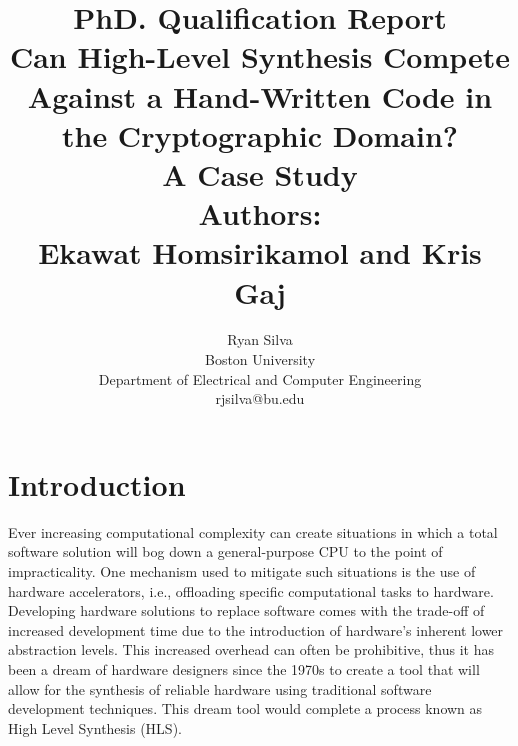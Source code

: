 \documentclass[11pt,journal,compsoc, onecolumn]{IEEEtran}
\begin{document}
\title{PhD. Qualification Report \\ \LARGE{\textbf{Can High-Level Synthesis Compete Against a Hand-Written Code in the Cryptographic Domain? \\ A Case Study \cite{sel}}} \\ Authors: \\ Ekawat Homsirikamol and Kris Gaj}

\author{Ryan Silva \\ Boston University \\ Department of Electrical and Computer Engineering \\ rjsilva@bu.edu
}


\maketitle


\IEEEdisplaynontitleabstractindextext
\IEEEpeerreviewmaketitle

\section{Introduction}
Ever increasing computational complexity can create situations in which a total software solution will bog down a general-purpose CPU to the point of impracticality. One mechanism used to mitigate such situations is the use of hardware accelerators, i.e., offloading specific computational tasks to hardware. Developing hardware solutions to replace software comes with the trade-off of increased development time due to the introduction of hardware's inherent lower abstraction levels. This increased overhead can often be prohibitive, thus it has been a dream of hardware designers since the 1970s to create a tool that will allow for the synthesis of reliable hardware using traditional software development techniques\cite{1}. This dream tool would complete a process known as High Level Synthesis (HLS).
\end{document}
